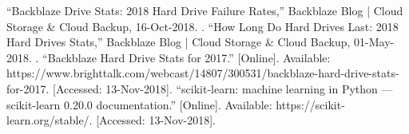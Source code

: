 \documentclass[conference]{IEEEtran}
\begin{document}
\begin{thebibliography}{99}
 “Backblaze Drive Stats: 2018 Hard Drive Failure Rates,” Backblaze Blog | Cloud Storage & Cloud Backup, 16-Oct-2018. .
 “How Long Do Hard Drives Last: 2018 Hard Drives Stats,” Backblaze Blog | Cloud Storage & Cloud Backup, 01-May-2018. .
 “Backblaze Hard Drive Stats for 2017.” [Online]. Available: https://www.brighttalk.com/webcast/14807/300531/backblaze-hard-drive-stats-for-2017. [Accessed: 13-Nov-2018].
 “scikit-learn: machine learning in Python — scikit-learn 0.20.0 documentation.” [Online]. Available: https://scikit-learn.org/stable/. [Accessed: 13-Nov-2018].

 



\end{thebibliography}
\end{document}

